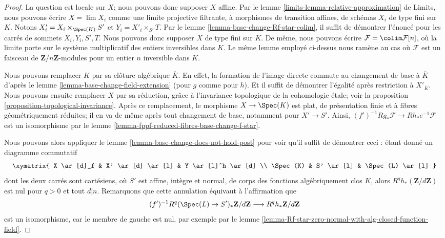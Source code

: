 \begin{proof}
La question est locale sur $X$; nous pouvons donc supposer $X$ affine.
Par le lemme \ref{limits-lemma-relative-approximation} de Limits,
nous pouvons écrire $X = \lim X_i$ comme une limite projective filtrante, à
morphismes de transition affines, de schémas $X_i$ de type fini sur $K$.
Notons $X'_i =  X_i \times_{\Spec(K)} S'$ et $Y_i = X'_i \times_{S'} T$.
Par le lemme \ref{lemma-base-change-Rf-star-colim},
il suffit de démontrer l'énoncé pour les carrés
de sommets $X_i, Y_i, S', T$.
Nous pouvons donc supposer $X$ de type fini sur $K$.
De même, nous pouvons écrire
$\mathcal{F} = \colim \mathcal{F}[n]$, où la limite porte
sur le système multiplicatif des entiers inversibles dans $K$.
Le même lemme employé ci-dessus nous ramène au cas où
$\mathcal{F}$ est un faisceau de $\mathbf{Z}/n\mathbf{Z}$-modules
pour un entier $n$ inversible dans $K$.

\medskip\noindent
Nous pouvons remplacer $K$ par sa clôture algébrique $\overline{K}$.
En effet, la formation de l'image directe commute au changement de base
à $\overline{K}$ d'après le
lemme \ref{lemma-base-change-field-extension} (pour $g$ comme pour
$h$). Et il suffit de démontrer l'égalité après
restriction à $X'_{\overline{K}}$. Nous pouvons ensuite remplacer
$X$ par sa réduction, grâce à l'invariance topologique de la cohomologie
étale; voir la
proposition \ref{proposition-topological-invariance}.
Après ce remplacement, le morphisme $X \to \Spec(K)$
est plat, de présentation finie et à fibres géométriquement réduites;
il en va de même après tout changement de base, notamment pour $X' \to S'$.
Ainsi, $(f')^{-1}Rg_*\mathcal{F} \to Rh_*e^{-1}\mathcal{F}$
est un isomorphisme par le lemme \ref{lemma-fppf-reduced-fibres-base-change-f-star}.

\medskip\noindent
Nous pouvons alors appliquer le
lemme \ref{lemma-base-change-does-not-hold-post}
pour voir qu'il suffit de démontrer ceci : étant donné un diagramme commutatif
$$
\xymatrix{
X \ar[d]_f & X' \ar[d] \ar[l] & Y \ar[l]^h \ar[d] \\
\Spec(K) & S' \ar[l] & \Spec(L) \ar[l]
}
$$
dont les deux carrés sont cartésiens, où $S'$ est affine, intègre et normal,
de corps des fonctions algébriquement clos $K$, alors
$R^qh_*(\mathbf{Z}/d\mathbf{Z})$ est nul pour $q > 0$ et tout $d | n$.
Remarquons que cette annulation équivaut à l'affirmation que
$$
(f')^{-1}R^q(\Spec(L) \to S')_*\mathbf{Z}/d\mathbf{Z}
\longrightarrow
R^qh_*\mathbf{Z}/d\mathbf{Z}
$$
est un isomorphisme, car le membre de gauche est nul, par exemple par le
lemme \ref{lemma-Rf-star-zero-normal-with-alg-closed-function-field}.


\end{proof}
